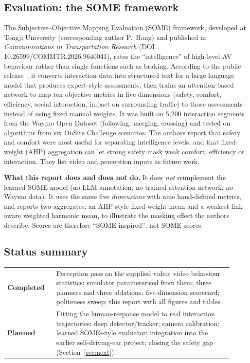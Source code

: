 \documentclass[11pt,a4paper]{article}
\newcommand{\done}{\textcolor{green!45!black}{\textbf{Completed}}}
\newcommand{\planned}{\textcolor{orange!80!black}{\textbf{Planned}}}
\begin{document}
\subsection*{Evaluation: the SOME framework}
The Subjective--Objective Mapping Evaluation (SOME) framework, developed at Tongji University (corresponding author P.~Hang) and published in \emph{Communications in Transportation Research} (DOI 10.26599/COMMTR.2026.9640041), rates the ``intelligence'' of high-level AV behaviour rather than single functions such as braking. According to the public release~\cite{some}, it converts interaction data into structured text for a large language model that produces expert-style assessments, then trains an attention-based network to map ten objective metrics in five dimensions (safety, comfort, efficiency, social interaction, impact on surrounding traffic) to those assessments instead of using fixed manual weights. It was built on 5{,}200 interaction segments from the Waymo Open Dataset (following, merging, crossing) and tested on algorithms from six OnSite Challenge scenarios. The authors report that safety and comfort were most useful for separating intelligence levels, and that fixed-weight (AHP) aggregation can let strong safety mask weak comfort, efficiency or interaction. They list video and perception inputs as future work.

\textbf{What this report does and does not do.} It does \emph{not} reimplement the learned SOME model (no LLM annotation, no trained attention network, no Waymo data). It uses the same five \emph{dimensions} with nine hand-defined metrics, and reports two aggregates: an AHP-style fixed-weight mean and a weakest-link-aware weighted harmonic mean, to illustrate the masking effect the authors describe. Scores are therefore ``SOME-inspired'', not SOME scores.

\subsection*{Status summary}
\begin{center}\small
\begin{tabular}{@{}p{0.2\linewidth}p{0.72\linewidth}@{}}
\toprule
\done & Perception pass on the supplied video; video behaviour statistics; simulator parameterised from them; three planners and three ablations; five-dimension scorecard; politeness sweep; this report with all figures and tables.\\
\planned & Fitting the human-response model to real interaction trajectories; deep detector/tracker; camera calibration; learned SOME-style evaluator; integration into the earlier self-driving-car project; closing the safety gap (Section~\ref{sec:next}).\\
\bottomrule
\end{tabular}
\end{center}
\end{document}
